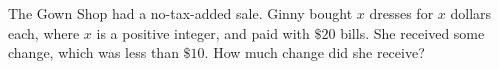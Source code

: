 The Gown Shop had a no-tax-added sale. Ginny bought $x$ dresses for $x$ dollars each, where $x$ is a positive integer, and paid with $\$20$ bills. She received some change, which was less than $\$10$. How much change did she receive?
